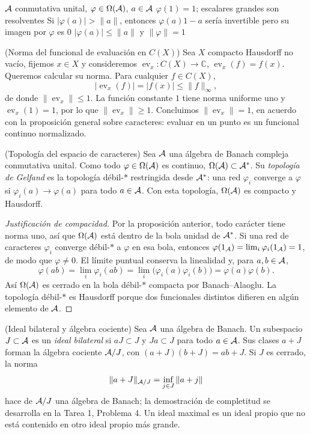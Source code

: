 \proofdiagram
{$\mathcal A$ conmutativa unital, $\varphi\in\Omega(\mathcal A)$, $a\in\mathcal A$}
{$\varphi(1)=1$; escalares grandes son resolventes}
{Si $|\varphi(a)|>\|a\|$, entonces $\varphi(a)1-a$ sería invertible pero su imagen por $\varphi$ es $0$}
{$|\varphi(a)|\le\|a\|$ y $\|\varphi\|=1$}

\begin{cthejemplo}{(Norma del funcional de evaluación en $C(X)$)}
Sea $X$ compacto Hausdorff no vacío, fijemos $x\in X$ y consideremos
$\operatorname{ev}_x:C(X)\to\mathbb C$, $\operatorname{ev}_x(f)=f(x)$.
Queremos calcular su norma. Para cualquier $f\in C(X)$,
\[
 |\operatorname{ev}_x(f)|=|f(x)|\le\|f\|_\infty,
\]
de donde $\|\operatorname{ev}_x\|\le1$. La función constante $1$
tiene norma uniforme uno y $\operatorname{ev}_x(1)=1$, por lo que
$\|\operatorname{ev}_x\|\ge1$. Concluimos
$\|\operatorname{ev}_x\|=1$, en acuerdo con la proposición general
sobre caracteres: evaluar en un punto es un funcional continuo
normalizado.
\end{cthejemplo}

\begin{cthdefinicion}{(Topología del espacio de caracteres)}
Sea $\mathcal A$ una álgebra de Banach compleja conmutativa unital.
Como todo $\varphi\in\Omega(\mathcal A)$ es continuo, $\Omega(\mathcal A)\subset\mathcal A^*$.
Su \emph{topología de Gelfand} es la topología débil-$*$
restringida desde $\mathcal A^*$: una red $\varphi_i$ converge a $\varphi$ si
$\varphi_i(a)\to\varphi(a)$ para todo $a\in\mathcal A$.
Con esta topología, $\Omega(\mathcal A)$ es compacto y Hausdorff.
\end{cthdefinicion}

\begin{proof}[Justificación de compacidad]
Por la proposición anterior, todo carácter tiene norma uno, así que
$\Omega(\mathcal A)$ está dentro de la bola unidad de $\mathcal A^*$. Si una red de
caracteres $\varphi_i$ converge débil-$*$ a $\varphi$ en esa bola,
entonces $\varphi(1_\mathcal A)=\lim_i\varphi_i(1_\mathcal A)=1$, de modo que
$\varphi\ne0$. El límite puntual conserva la linealidad y, para
$a,b\in\mathcal A$,
\[
 \varphi(ab)=\lim_i\varphi_i(ab)
 =\lim_i\bigl(\varphi_i(a)\varphi_i(b)\bigr)
 =\varphi(a)\varphi(b).
\]
Así $\Omega(\mathcal A)$ es cerrado en la bola débil-$*$ compacta por
Banach--Alaoglu. La topología débil-$*$ es Hausdorff porque dos
funcionales distintos difieren en algún elemento de $\mathcal A$.
\end{proof}

\begin{cthdefinicion}{(Ideal bilateral y álgebra cociente)}
Sea $\mathcal A$ una álgebra de Banach. Un subespacio $J\subset\mathcal A$ es un
\emph{ideal bilateral} si $aJ\subset J$ y
$Ja\subset J$ para todo $a\in\mathcal A$. Sus clases $a+J$ forman la álgebra cociente
$\mathcal A/J$, con $(a+J)(b+J)=ab+J$. Si $J$ es cerrado, la norma
\[
 \|a+J\|_{\mathcal A/J}=\inf_{j\in J}\|a+j\|
\]
hace de $\mathcal A/J$ una álgebra de Banach; la demostración de completitud se desarrolla en la
Tarea 1, Problema 4. Un ideal maximal es un ideal propio que no está contenido en otro
ideal propio más grande.
\end{cthdefinicion}


